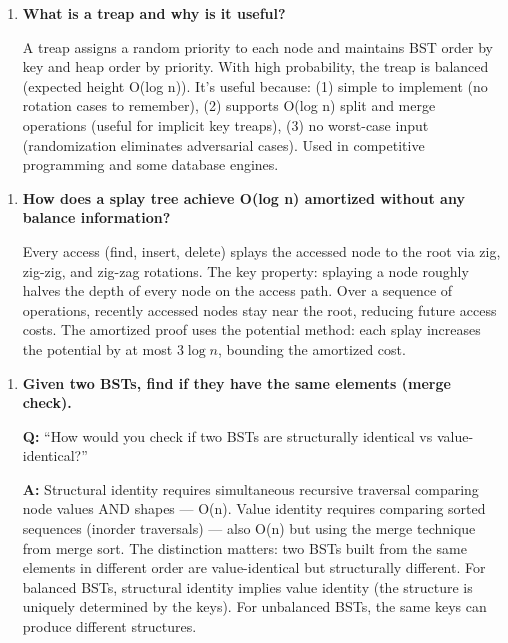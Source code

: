 \begin{enumerate}
\item \textbf{What is a treap and why is it useful?}

A treap assigns a random priority to each node and maintains BST order by key and heap order by priority. With high probability, the treap is balanced (expected height O(log n)). It's useful because: (1) simple to implement (no rotation cases to remember), (2) supports O(log n) split and merge operations (useful for implicit key treaps), (3) no worst-case input (randomization eliminates adversarial cases). Used in competitive programming and some database engines.
\end{enumerate}

\begin{enumerate}
\item \textbf{How does a splay tree achieve O(log n) amortized without any balance information?}

Every access (find, insert, delete) splays the accessed node to the root via zig, zig-zig, and zig-zag rotations. The key property: splaying a node roughly halves the depth of every node on the access path. Over a sequence of operations, recently accessed nodes stay near the root, reducing future access costs. The amortized proof uses the potential method: each splay increases the potential by at most $3\log n$, bounding the amortized cost.
\end{enumerate}

\begin{enumerate}
\item \textbf{Given two BSTs, find if they have the same elements (merge check).}

\textbf{Q:} ``How would you check if two BSTs are structurally identical vs value-identical?''

\textbf{A:} Structural identity requires simultaneous recursive traversal comparing node values AND shapes --- O(n). Value identity requires comparing sorted sequences (inorder traversals) --- also O(n) but using the merge technique from merge sort. The distinction matters: two BSTs built from the same elements in different order are value-identical but structurally different. For balanced BSTs, structural identity implies value identity (the structure is uniquely determined by the keys). For unbalanced BSTs, the same keys can produce different structures.
\end{enumerate}

